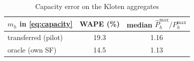 \begin{table}[t]
\centering
\caption{Capacity error on the Kloten aggregates}
\label{tab:capacity}
\begin{tabular}{lcc}
\toprule
$m_h$ in \eqref{eq:capacity} & WAPE (\%) & median $\hat{P}^{\max}_{h}/{P}^{\max}_{h}$ \\
\midrule
transferred (pilot) & 19.3 & 1.16 \\
oracle (own SF) & 14.5 & 1.13 \\
\bottomrule
\end{tabular}
\end{table}